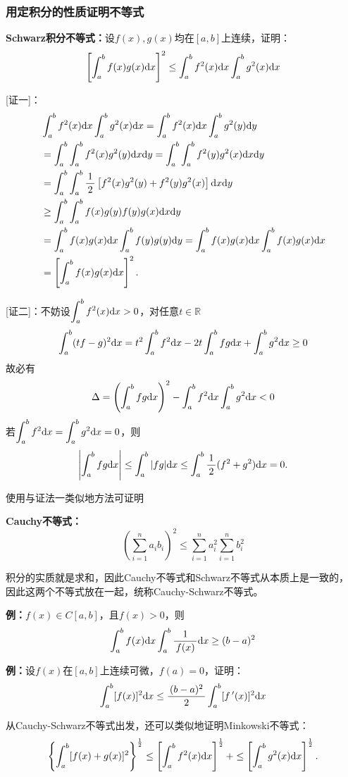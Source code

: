 \subsubsection{用定积分的性质证明不等式}

\begin{thx}
	{\bf Schwarz积分不等式：}设$f(x),g(x)$均在$[a,b]$上连续，证明：
	$$\left[\dint_a^bf(x)g(x)\d x\right]^2
	\leq\dint_a^bf^2(x)\d x\dint_a^bg^2(x)\d x$$
\end{thx}

[证一]：
\begin{align*}
	&\dint_a^bf^2(x)\d x\dint_a^bg^2(x)\d x
	=\dint_a^bf^2(x)\d x\dint_a^bg^2(y)\d y\\
	&=\dint_a^b\dint_a^bf^2(x)g^2(y)\d x\d y
	=\dint_a^b\dint_a^bf^2(y)g^2(x)\d x\d y\\
	&=\dint_a^b\dint_a^b\df12\left[f^2(x)g^2(y)
	+f^2(y)g^2(x)\right]\d x\d y\\
	&\geq \dint_a^b\dint_a^bf(x)g(y)
	f(y)g(x)\d x\d y\\
	&=\dint_a^bf(x)g(x)\d x\dint_a^bf(y)g(y)\d y
	=\dint_a^bf(x)g(x)\d x\dint_a^bf(x)g(x)\d x\\
	&=\left[\dint_a^bf(x)g(x)\d x\right]^2.
\end{align*}
\fin

[证二]：不妨设$\dint_a^bf^2(x)\d x>0$，对任意$t\in\mathbb{R}$
$$\dint_a^b(tf-g)^2\d x=t^2\dint_a^bf^2\d x-2t\dint_a^bfg\d x
+\dint_a^bg^2\d x\geq 0$$
故必有
$$\Delta=\left(\dint_a^bfg\d x\right)^2-\dint_a^bf^2\d x\dint_a^b
g^2\d x<0$$
若$\dint_a^bf^2\d x=\dint_a^b g^2\d x=0$，则
$$\left|\dint_a^bfg\d x\right|\leq\dint_a^b|fg|\d x
\leq\dint_a^b\df12(f^2+g^2)\d x=0.$$
\fin

使用与证法一类似地方法可证明
\begin{thx}
	{\bf Cauchy不等式：}
	$$\left(\sum\limits_{i=1}^na_ib_i\right)^2\leq
	\sum\limits_{i=1}^na_i^2\sum\limits_{i=1}^nb_i^2$$
\end{thx}
积分的实质就是求和，因此Cauchy不等式和Schwarz不等式从本质上是一致的，
因此这两个不等式放在一起，统称{\kaishu Cauchy-Schwarz不等式}。

{\bf 例：}$f(x)\in C[a,b]$，且$f(x)>0$，则
$$\dint_a^bf(x)\d x\dint_a^b\df1{f(x)}\d x\geq(b-a)^2$$

{\bf 例：}设$f(x)$在$[a,b]$上连续可微，$f(a)=0$，证明：
$$\dint_a^b[f(x)]^2\d x\leq\df{(b-a)^2}{2}\dint_a^b[f\,'(x)]^2\d x$$

从Cauchy-Schwarz不等式出发，还可以类似地证明{\kaishu Minkowski不等式}：
$$\left\{\dint_a^b[f(x)+g(x)]^2\right\}^{\frac12}
\leq\left[\dint_a^bf^2(x)\d x\right]^{\frac12}
+\leq\left[\dint_a^bg^2(x)\d x\right]^{\frac12}.$$

